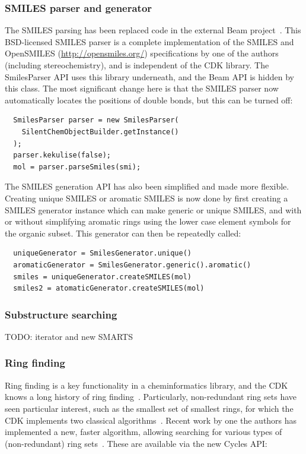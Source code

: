\documentclass[10pt]{bmcart}
\begin{document}
  \subsubsection*{SMILES parser and generator}

  The SMILES parsing has been replaced code in the external Beam project~\cite{Beam}.
  This BSD-licensed SMILES parser is a complete implementation of the SMILES
  and OpenSMILES (\url{http://opensmiles.org/}) specifications by one of the
  authors (including stereochemistry), and is independent of
  the CDK library. The SmilesParser API uses this library underneath, and the
  Beam API is hidden by this class. The most significant change here is that
  the SMILES parser now automatically locates the positions of double bonds,
  but this can be turned off:

\begin{verbatim}
  SmilesParser parser = new SmilesParser(
    SilentChemObjectBuilder.getInstance()
  );
  parser.kekulise(false);
  mol = parser.parseSmiles(smi);
\end{verbatim}

  The SMILES generation API has also been simplified and made more flexible.
  Creating unique SMILES or aromatic SMILES is now done by first creating a
  SMILES generator instance which can make generic or unique SMILES, and with
  or without simplifying aromatic rings using the lower case element symbols
  for the organic subset. This generator can then be repeatedly called:

\begin{verbatim}
  uniqueGenerator = SmilesGenerator.unique()
  aromaticGenerator = SmilesGenerator.generic().aromatic()
  smiles = uniqueGenerator.createSMILES(mol)
  smiles2 = atomaticGenerator.createSMILES(mol)
\end{verbatim}

  \subsubsection*{Substructure searching}

  TODO: iterator and new SMARTS

  \subsubsection*{Ring finding}

  Ring finding is a key functionality in a cheminformatics library, and the CDK
  knows a long history of ring finding~\cite{May2014}. Particularly, non-redundant
  ring sets have seen particular interest, such as the smallest set of smallest
  rings, for which the CDK implements two classical algorithms~\cite{Figueras1996,Berger2004}.
  Recent work by one the authors has implemented a new, faster algorithm, allowing
  searching for various types of (non-redundant) ring sets~\cite{May2014}. These
  are available via the new Cycles API:
\end{document}
